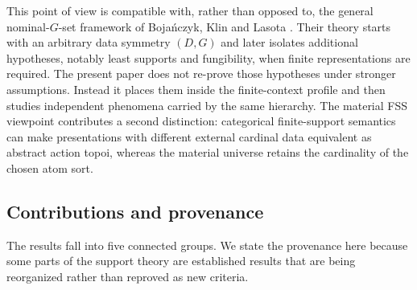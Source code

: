 \documentclass{lmcs}
\begin{document}
This point of view is compatible with, rather than opposed to, the general
nominal-$G$-set framework of Boja\'nczyk, Klin and Lasota
\cite{BKL14}. Their theory starts with an arbitrary data symmetry
$(D,G)$ and later isolates additional hypotheses, notably least supports and
fungibility, when finite representations are required. The present paper
does not re-prove those hypotheses under stronger assumptions. Instead it
places them inside the finite-context profile and then studies independent
phenomena carried by the same hierarchy. The material FSS viewpoint
\cite{AC20,AC22} contributes a second distinction: categorical finite-support semantics can make presentations with different
external cardinal data equivalent as abstract action topoi, whereas the
material universe retains the cardinality of the chosen atom sort.

\subsection{Contributions and provenance}\label{subsec:claims}

The results fall into five connected groups. We state the provenance here
because some parts of the support theory are established results that are
being reorganized rather than reproved as new criteria.
\end{document}
